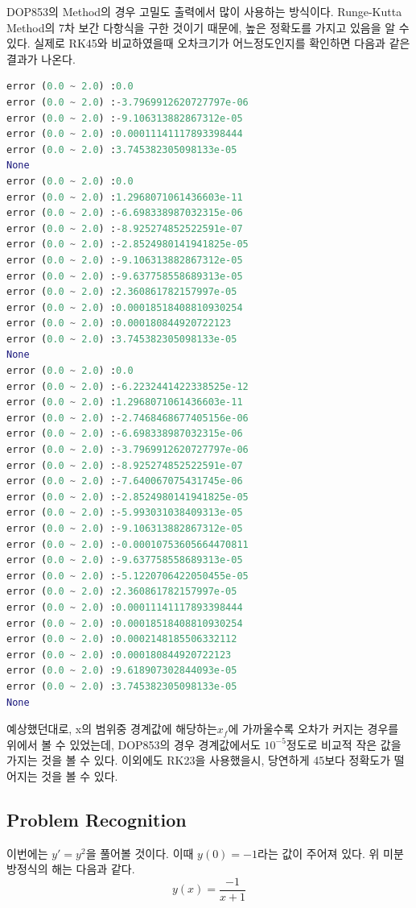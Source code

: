 \documentclass[11pt]{article}
\begin{document}
DOP853의 Method의 경우 고밀도 출력에서 많이 사용하는 방식이다. Runge-Kutta Method의 7차 보간 다항식을 구한 것이기 때문에, 높은 정확도를 가지고 있음을 알 수 있다. 실제로 RK45와 비교하였을때 오차크기가 어느정도인지를 확인하면 다음과 같은 결과가 나온다. 
\begin{lstlisting}[language=Python]
error (0.0 ~ 2.0) :0.0
error (0.0 ~ 2.0) :-3.7969912620727797e-06
error (0.0 ~ 2.0) :-9.106313882867312e-05
error (0.0 ~ 2.0) :0.00011141117893398444
error (0.0 ~ 2.0) :3.745382305098133e-05
None
error (0.0 ~ 2.0) :0.0
error (0.0 ~ 2.0) :1.2968071061436603e-11
error (0.0 ~ 2.0) :-6.698338987032315e-06
error (0.0 ~ 2.0) :-8.925274852522591e-07
error (0.0 ~ 2.0) :-2.8524980141941825e-05
error (0.0 ~ 2.0) :-9.106313882867312e-05
error (0.0 ~ 2.0) :-9.637758558689313e-05
error (0.0 ~ 2.0) :2.360861782157997e-05
error (0.0 ~ 2.0) :0.00018518408810930254
error (0.0 ~ 2.0) :0.000180844920722123
error (0.0 ~ 2.0) :3.745382305098133e-05
None
error (0.0 ~ 2.0) :0.0
error (0.0 ~ 2.0) :-6.2232441422338525e-12
error (0.0 ~ 2.0) :1.2968071061436603e-11
error (0.0 ~ 2.0) :-2.7468468677405156e-06
error (0.0 ~ 2.0) :-6.698338987032315e-06
error (0.0 ~ 2.0) :-3.7969912620727797e-06
error (0.0 ~ 2.0) :-8.925274852522591e-07
error (0.0 ~ 2.0) :-7.640067075431745e-06
error (0.0 ~ 2.0) :-2.8524980141941825e-05
error (0.0 ~ 2.0) :-5.993031038409313e-05
error (0.0 ~ 2.0) :-9.106313882867312e-05
error (0.0 ~ 2.0) :-0.00010753605664470811
error (0.0 ~ 2.0) :-9.637758558689313e-05
error (0.0 ~ 2.0) :-5.1220706422050455e-05
error (0.0 ~ 2.0) :2.360861782157997e-05
error (0.0 ~ 2.0) :0.00011141117893398444
error (0.0 ~ 2.0) :0.00018518408810930254
error (0.0 ~ 2.0) :0.0002148185506332112
error (0.0 ~ 2.0) :0.000180844920722123
error (0.0 ~ 2.0) :9.618907302844093e-05
error (0.0 ~ 2.0) :3.745382305098133e-05
None
\end{lstlisting}
예상했던대로, x의 범위중 경계값에 해당하는$x_f$에 가까울수록 오차가 커지는 경우를 위에서 볼 수 있었는데, DOP853의 경우 경계값에서도 $10^{-5}$정도로 비교적 작은 값을 가지는 것을 볼 수 있다. 이외에도 RK23을 사용했을시, 당연하게 45보다 정확도가 떨어지는 것을 볼 수 있다. 







\subsection{Problem Recognition} 
이번에는 $y' = y^2$을 풀어볼 것이다. 이때 $y(0) = -1$라는 값이 주어져 있다. 위 미분방정식의 해는 다음과 같다.
\begin{equation}
y(x) = \frac{-1}{x + 1}
\end{equation}
\end{document}
